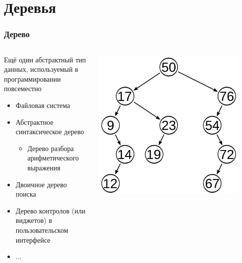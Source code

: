 \documentclass[xetex,mathserif,serif]{beamer}
\begin{document}
	\section{Деревья}

	\begin{frame}
		\frametitle{Дерево}
		\begin{columns}
			\begin{column}{0.6\textwidth}
				Ещё один абстрактный тип данных, используемый в программировании повсеместно
				\begin{itemize}
					\item Файловая система
					\item Абстрактное синтаксическое дерево
					\begin{itemize}
						\item Дерево разбора арифметического выражения
					\end{itemize}
					\item Двоичное дерево поиска
					\item Дерево контролов (или виджетов) в пользовательском интерфейсе
					\item ...
				\end{itemize}
			\end{column}
			\begin{column}{0.4\textwidth}
				\begin{center}
					\includegraphics[width=0.9\textwidth]{tree.png}
				\end{center}
			\end{column}
		\end{columns}
	\end{frame}
\end{document}
